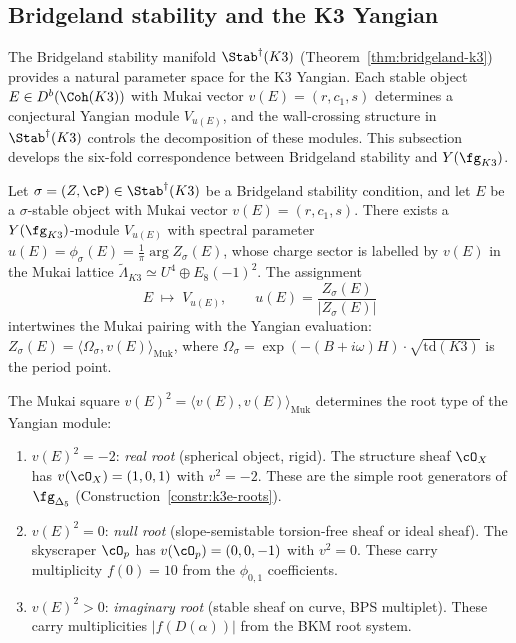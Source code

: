\subsection{Bridgeland stability and the K3 Yangian}
\label{subsec:bridgeland-k3-yangian}

The Bridgeland stability manifold $\Stab^\dagger(K3)$ (Theorem~\ref{thm:bridgeland-k3}) provides a natural parameter space for the K3 Yangian.  Each stable object $E \in D^b(\Coh(K3))$ with Mukai vector $v(E) = (r, c_1, s)$ determines a conjectural Yangian module $V_{u(E)}$, and the wall-crossing structure in $\Stab^\dagger(K3)$ controls the decomposition of these modules.  This subsection develops the six-fold correspondence between Bridgeland stability and $Y(\fg_{K3})$.

\begin{conjecture}
\label{conj:stable-yangian-module}
\ClaimStatusConjectured
Let $\sigma = (Z, \cP) \in \Stab^\dagger(K3)$ be a Bridgeland stability condition, and let $E$ be a $\sigma$-stable object with Mukai vector $v(E) = (r, c_1, s)$.  There exists a $Y(\fg_{K3})$-module $V_{u(E)}$ with spectral parameter $u(E) = \phi_\sigma(E) = \frac{1}{\pi}\arg Z_\sigma(E)$, whose charge sector is labelled by $v(E)$ in the Mukai lattice $\widetilde{\Lambda}_{K3} \simeq U^4 \oplus E_8(-1)^2$.  The assignment
\[
  E \;\longmapsto\; V_{u(E)}, \qquad u(E) = \frac{Z_\sigma(E)}{|Z_\sigma(E)|}
\]
intertwines the Mukai pairing with the Yangian evaluation:
$Z_\sigma(E) = \langle \Omega_\sigma, v(E) \rangle_{\mathrm{Muk}}$, where $\Omega_\sigma = \exp(-(B + i\omega)H) \cdot \sqrt{\mathrm{td}(K3)}$ is the period point.
\end{conjecture}

\begin{remark}
\label{rem:bridgeland-root-type}
The Mukai square $v(E)^2 = \langle v(E), v(E) \rangle_{\mathrm{Muk}}$ determines the root type of the Yangian module:
\begin{enumerate}[label=(\roman*)]
\item $v(E)^2 = -2$: \emph{real root} (spherical object, rigid).  The structure sheaf $\cO_X$ has $v(\cO_X) = (1, 0, 1)$ with $v^2 = -2$.  These are the simple root generators of $\fg_{\Delta_5}$ (Construction~\ref{constr:k3e-roots}).
\item $v(E)^2 = 0$: \emph{null root} (slope-semistable torsion-free sheaf or ideal sheaf).  The skyscraper $\cO_p$ has $v(\cO_p) = (0, 0, -1)$ with $v^2 = 0$.  These carry multiplicity $f(0) = 10$ from the $\phi_{0,1}$ coefficients.
\item $v(E)^2 > 0$: \emph{imaginary root} (stable sheaf on curve, BPS multiplet).  These carry multiplicities $|f(D(\alpha))|$ from the BKM root system.
\end{enumerate}
\end{remark}

